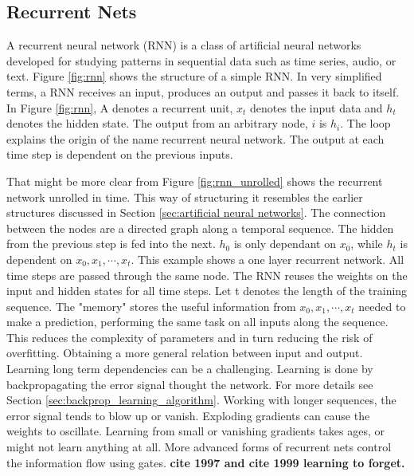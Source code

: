 \documentclass{article}
\begin{document}
\subsection{Recurrent Nets} \label{sec:reccurent_nets}

A recurrent neural network (RNN) is a class of artificial neural networks developed for studying patterns in sequential data such as time series, audio, or text. Figure \ref{fig:rnn} shows the structure of a simple RNN. %
In very simplified terms, a RNN receives an input, produces an output and passes it back to itself. In Figure \ref{fig:rnn}, A denotes a recurrent unit, $x_t$ denotes the input data and  $h_t$ denotes the hidden state. The output from an arbitrary node, $i$ is $h_i$. The loop explains the origin of the name recurrent neural network. The output at each time step is dependent on the previous inputs.

That might be more clear from Figure \ref{fig:rnn_unrolled} shows the recurrent network unrolled in time. This way of structuring it resembles the earlier structures discussed in Section \ref{sec:artificial neural networks}. The connection between the nodes %
are a directed graph along a temporal sequence. The hidden from the previous step is fed into the next. $h_0$ is only dependant on $x_0$, while $h_t$ is dependent on $x_0, x_1, \cdots, x_t $. This example shows a one layer recurrent network. All time steps are passed through the same node. The RNN reuses the weights on the input and hidden states for all time steps. Let t denotes the length of the training sequence. The "memory" stores the useful information from $x_0, x_1, \cdots, x_t $ needed to make a prediction, performing the same task on all inputs along the sequence. This reduces the complexity of parameters and in turn reducing the risk of overfitting. Obtaining a more general relation between input and output.
Learning long term dependencies can be a challenging. Learning is done by backpropagating the error signal thought the network. For more details see Section \ref{sec:backprop_learning_algorithm}. Working with longer sequences, the error signal tends to blow up or vanish. Exploding gradients can cause the weights to oscillate. Learning from small or vanishing gradients takes ages, or might not learn anything at all. More advanced forms of recurrent nets control the information flow using gates. \textbf{cite 1997 and cite 1999 learning to forget.}
\end{document}
